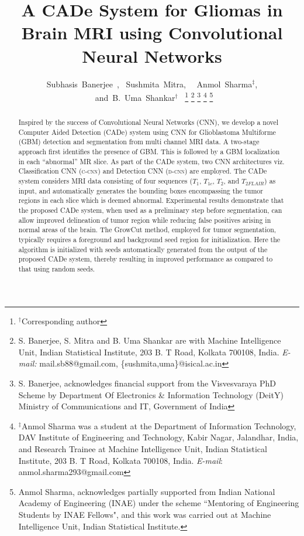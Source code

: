 \documentclass[journal,twocolumn]{IEEEtran}
\begin{document}
	
	\author{Subhasis~Banerjee~,%
		~Sushmita~Mitra,~%
		~Anmol~Sharma$^\ddag$,
		~and~B.~Uma~Shankar$^\dagger$~%
		\thanks{$^\dagger$Corresponding author}%
		\thanks{S. Banerjee, S. Mitra and B. Uma Shankar are with Machine Intelligence Unit, Indian Statistical Institute, 203 B. T Road, Kolkata 700108, India.
			\emph{E-mail:} mail.sb88@gmail.com, \{sushmita,uma\}@isical.ac.in}
		\thanks{S. Banerjee, acknowledges financial
			support from the Visvesvaraya PhD Scheme by Department
			Of Electronics \& Information Technology (DeitY) Ministry
			of Communications and IT, Government of India}
		\thanks{$^\ddag$Anmol Sharma was a student at the Department of Information Technology, DAV Institute of Engineering and Technology, Kabir Nagar, Jalandhar, India, and Research Trainee at Machine Intelligence Unit, Indian Statistical Institute, 203 B. T Road, Kolkata 700108, India.	\emph{E-mail}: anmol.sharma293@gmail.com}
		\thanks{Anmol Sharma, acknowledges partially supported from Indian National Academy of Engineering (INAE) under the scheme ``Mentoring of Engineering Students by INAE Fellows",
			and this work was carried out at Machine Intelligence Unit, Indian Statistical Institute.}
	}%
	
	
	\title{A CADe System for Gliomas in Brain MRI using Convolutional Neural Networks}
	
	\maketitle
	\thispagestyle{empty}
	\begin{abstract}
		Inspired by the  success of Convolutional Neural Networks (CNN), we develop  a novel Computer Aided Detection (CADe) system using CNN for Glioblastoma Multiforme (GBM) detection and segmentation from multi channel MRI data. A two-stage approach first identifies  the presence of GBM. This is  followed by a GBM localization in each  ``abnormal'' MR slice. As part of the CADe system,  two CNN architectures viz. Classification CNN ({\scshape{c-cnn}}) and Detection CNN ({\scshape{d-cnn}}) are employed.  The CADe system considers MRI data  consisting of four sequences ($T_1$, $T_{1c}$, $T_2$, and $T_{2FLAIR}$) as input, and  automatically generates the bounding boxes encompassing the tumor regions in each slice which is deemed abnormal. Experimental results demonstrate that the  proposed CADe system, when used as a preliminary step before segmentation, can allow improved delineation of tumor region while reducing false positives arising in normal areas of the brain. The  GrowCut  method, employed  for tumor segmentation,  typically requires a foreground and background seed region for initialization. Here  the algorithm is initialized with seeds automatically generated from  the output of the  proposed CADe system, thereby resulting in improved performance as  compared to that using  random seeds.
	\end{abstract}
\end{document}
